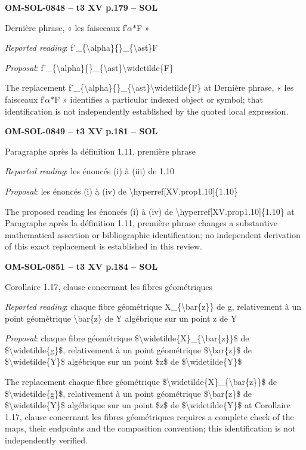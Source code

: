\par\noindent\textbf{OM-SOL-0848 -- t3 XV p.179 -- SOL}\par
Dernière phrase, « les faisceaux f′\ensuremath{\alpha}\ensuremath{\ast}F »\par
\emph{Reported reading}: f'\_\{\textbackslash{}alpha\}\{\}\_\{\textbackslash{}ast\}F\par
\emph{Proposal}: f'\_\{\textbackslash{}alpha\}\{\}\_\{\textbackslash{}ast\}\textbackslash{}widetilde\{F\}\par
The replacement f'\_\{\textbackslash{}alpha\}\{\}\_\{\textbackslash{}ast\}\textbackslash{}widetilde\{F\} at Dernière phrase, « les faisceaux f′\ensuremath{\alpha}\ensuremath{\ast}F » identifies a particular indexed object or symbol; that identification is not independently established by the quoted local expression.\par
\par\noindent\textbf{OM-SOL-0849 -- t3 XV p.181 -- SOL}\par
Paragraphe après la définition 1.11, première phrase\par
\emph{Reported reading}: les énoncés (i) à (iii) de 1.10\par
\emph{Proposal}: les énoncés (i) à (iv) de \textbackslash{}hyperref[XV.prop1.10]\{1.10\}\par
The proposed reading les énoncés (i) à (iv) de \textbackslash{}hyperref[XV.prop1.10]\{1.10\} at Paragraphe après la définition 1.11, première phrase changes a substantive mathematical assertion or bibliographic identification; no independent derivation of this exact replacement is established in this review.\par
\par\noindent\textbf{OM-SOL-0851 -- t3 XV p.184 -- SOL}\par
Corollaire 1.17, clause concernant les fibres géométriques\par
\emph{Reported reading}: chaque fibre géométrique X\_\{\textbackslash{}bar\{z\}\} de g, relativement à un point géométrique \textbackslash{}bar\{z\} de Y algébrique sur un point z de Y\par
\emph{Proposal}: chaque fibre géométrique \$\textbackslash{}widetilde\{X\}\_\{\textbackslash{}bar\{z\}\}\$ de \$\textbackslash{}widetilde\{g\}\$, relativement à un point géométrique \$\textbackslash{}bar\{z\}\$ de \$\textbackslash{}widetilde\{Y\}\$ algébrique sur un point \$z\$ de \$\textbackslash{}widetilde\{Y\}\$\par
The replacement chaque fibre géométrique \$\textbackslash{}widetilde\{X\}\_\{\textbackslash{}bar\{z\}\}\$ de \$\textbackslash{}widetilde\{g\}\$, relativement à un point géométrique \$\textbackslash{}bar\{z\}\$ de \$\textbackslash{}widetilde\{Y\}\$ algébrique sur un point \$z\$ de \$\textbackslash{}widetilde\{Y\}\$ at Corollaire 1.17, clause concernant les fibres géométriques requires a complete check of the maps, their endpoints and the composition convention; this identification is not independently verified.\par
